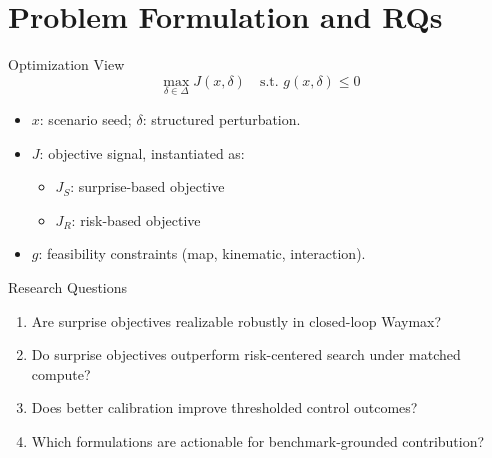 \section{Problem Formulation and RQs}

\begin{frame}{Optimization View}
\[
\max_{\delta \in \Delta} J(x,\delta)
\quad
\text{s.t. } g(x,\delta)\le 0
\]
\begin{itemize}
    \item \(x\): scenario seed; \(\delta\): structured perturbation.
    \item \(J\): objective signal, instantiated as:
    \begin{itemize}
        \item \(J_S\): surprise-based objective
        \item \(J_R\): risk-based objective
    \end{itemize}
    \item \(g\): feasibility constraints (map, kinematic, interaction).
\end{itemize}
\end{frame}

\begin{frame}{Research Questions}
\begin{enumerate}
    \item Are surprise objectives realizable robustly in closed-loop Waymax?
    \item Do surprise objectives outperform risk-centered search under matched compute?
    \item Does better calibration improve thresholded control outcomes?
    \item Which formulations are actionable for benchmark-grounded contribution?
\end{enumerate}
\end{frame}
